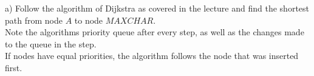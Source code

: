 a) Follow the algorithm of Dijkstra as covered in the lecture and find the shortest path from node $A$ to node $MAXCHAR$.\\
Note the algorithms priority queue after every step, as well as the changes made to the queue in the step.\\
If nodes have equal priorities, the algorithm follows the node that was inserted first.\\
